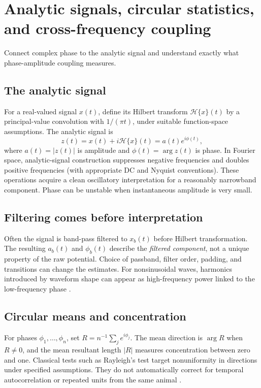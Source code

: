 \chapter{Analytic signals, circular statistics, and cross-frequency coupling}\label{ch:hilbert}
\begin{readergoal}Connect complex phase to the analytic signal and understand exactly what phase-amplitude coupling measures.\end{readergoal}
\section{The analytic signal}
For a real-valued signal $x(t)$, define its Hilbert transform $\mathcal H\{x\}(t)$ by a principal-value convolution with $1/(\pi t)$, under suitable function-space assumptions. The analytic signal is
\[z(t)=x(t)+i\mathcal H\{x\}(t)=a(t)e^{i\phi(t)},\]
where $a(t)=|z(t)|$ is amplitude and $\phi(t)=\arg z(t)$ is phase. In Fourier space, analytic-signal construction suppresses negative frequencies and doubles positive frequencies (with appropriate DC and Nyquist conventions). These operations acquire a clean oscillatory interpretation for a reasonably narrowband component. Phase can be unstable when instantaneous amplitude is very small.

\section{Filtering comes before interpretation}
Often the signal is band-pass filtered to $x_b(t)$ before Hilbert transformation. The resulting $a_b(t)$ and $\phi_b(t)$ describe the \emph{filtered component}, not a unique property of the raw potential. Choice of passband, filter order, padding, and transitions can change the estimates. For nonsinusoidal waves, harmonics introduced by waveform shape can appear as high-frequency power linked to the low-frequency phase \cite{ColeVoytek2018}.

\section{Circular means and concentration}
For phases $\phi_1,\ldots,\phi_n$, set $R=n^{-1}\sum_j e^{i\phi_j}$. The mean direction is $\arg R$ when $R\ne0$, and the mean resultant length $|R|$ measures concentration between zero and one. Classical tests such as Rayleigh's test target nonuniformity in directions under specified assumptions. They do not automatically correct for temporal autocorrelation or repeated units from the same animal \cite{Berens2009}.

